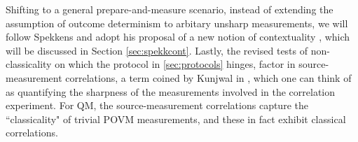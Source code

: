 \begin{itemize}
Shifting to a general prepare-and-measure scenario, instead of extending the assumption of outcome determinism to arbitary unsharp measurements, we will follow Spekkens and adopt his proposal of a new notion of contextuality \cite{Spekkens2005}, which will be discussed in Section \ref{sec:spekkcont}.
Lastly, the revised tests of non-classicality on which the protocol in \ref{sec:protocols} hinges, factor in source-measurement correlations, a term coined by Kunjwal in \cite{Kunjwal2019}, which one can think of as quantifying the sharpness of the measurements involved in the correlation experiment. For QM, the source-measurement correlations capture the ``classicality" of trivial POVM measurements, and these in fact exhibit classical correlations.
\end{itemize}